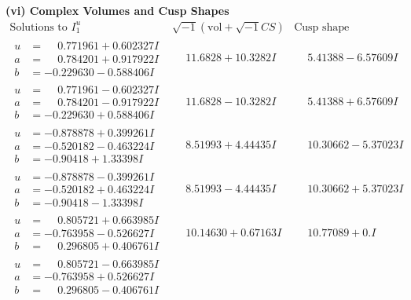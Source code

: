 \documentclass[1p]{elsarticle_modified}
\theoremstyle{definition}
\newcommand{\I}{\sqrt{-1}}
\begin{document}
\newpage\flushleft \textbf{(vi) Complex Volumes and Cusp Shapes}
$$\begin{array}{c|c|c}  
\text{Solutions to }I^u_{1}& \I (\text{vol} + \sqrt{-1}CS) & \text{Cusp shape}\\
 \hline 
\begin{aligned}
u &= \phantom{-}0.771961 + 0.602327 I \\
a &= \phantom{-}0.784201 + 0.917922 I \\
b &= -0.229630 - 0.588406 I\end{aligned}
 & \phantom{-}11.6828 + 10.3282 I & \phantom{-}5.41388 - 6.57609 I \\ \hline\begin{aligned}
u &= \phantom{-}0.771961 - 0.602327 I \\
a &= \phantom{-}0.784201 - 0.917922 I \\
b &= -0.229630 + 0.588406 I\end{aligned}
 & \phantom{-}11.6828 - 10.3282 I & \phantom{-}5.41388 + 6.57609 I \\ \hline\begin{aligned}
u &= -0.878878 + 0.399261 I \\
a &= -0.520182 - 0.463224 I \\
b &= -0.90418 + 1.33398 I\end{aligned}
 & \phantom{-}8.51993 + 4.44435 I & \phantom{-}10.30662 - 5.37023 I \\ \hline\begin{aligned}
u &= -0.878878 - 0.399261 I \\
a &= -0.520182 + 0.463224 I \\
b &= -0.90418 - 1.33398 I\end{aligned}
 & \phantom{-}8.51993 - 4.44435 I & \phantom{-}10.30662 + 5.37023 I \\ \hline\begin{aligned}
u &= \phantom{-}0.805721 + 0.663985 I \\
a &= -0.763958 - 0.526627 I \\
b &= \phantom{-}0.296805 + 0.406761 I\end{aligned}
 & \phantom{-}10.14630 + 0.67163 I & \phantom{-}10.77089 + 0. I\phantom{ +0.000000I} \\ \hline\begin{aligned}
u &= \phantom{-}0.805721 - 0.663985 I \\
a &= -0.763958 + 0.526627 I \\
b &= \phantom{-}0.296805 - 0.406761 I\end{aligned}

\end{array}$$
\end{document}
